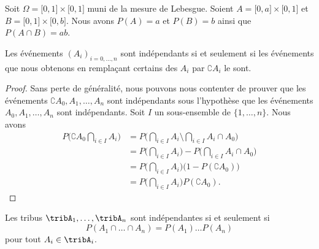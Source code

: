 \begin{example}
	Soit \( \Omega=\mathopen[ 0 , 1 \mathclose]\times \mathopen[ 0 , 1 \mathclose]\) muni de la mesure de Lebesgue. Soient \( A=\mathopen[ 0 , a \mathclose]\times \mathopen[ 0 , 1 \mathclose]\) et \( B=\mathopen[ 0 , 1 \mathclose]\times \mathopen[ 0 , b \mathclose]\). Nous avons \( P(A)=a\) et \( P(B)=b\) ainsi que \( P(A\cap B)=ab\).
\end{example}

\begin{lemma}       \label{LemIndepEvenCompl}
	Les événements \( (A_i)_{i=0,\ldots,n}\) sont indépendants si et seulement si les événements que nous obtenons en remplaçant certains des \( A_i\) par \( \complement A_i\) le sont.
\end{lemma}

\begin{proof}
	Sans perte de généralité, nous pouvons nous contenter de prouver que les événements \( \complement A_0,A_1,\ldots,A_n\) sont indépendants sous l'hypothèse que les événements \( A_0,A_1,\ldots,A_n\) sont indépendants. Soit \( I\) un sous-ensemble de \( \{ 1,\ldots,n \}\). Nous avons
	\begin{subequations}
		\begin{align}
			P\big( \complement A_0\bigcap_{i\in I}A_i \big) & =P\big( \bigcap_{i\in I}A_i\setminus\bigcap_{i\in I}A_i\cap A_0 \big)      \\
			                                                & =P\big( \bigcap_{i\in I}A_i \big)-P\big( \bigcap_{i\in I}A_i\cap A_0 \big) \\
			                                                & =P\big( \bigcap_{i\in I}A_i \big)\big( 1-P(\complement A_0) \big)          \\
			                                                & =P\big( \bigcap_{i\in I}A_i \big)P(\complement A_0).
		\end{align}
	\end{subequations}
\end{proof}

\begin{lemma}       \label{LemTribIndepProdProb}
	Les tribus \( \tribA_1,\ldots,\tribA_n\) sont indépendantes si et seulement si
	\begin{equation}
		P(A_1\cap\ldots\cap A_n)=P(A_1)\ldots P(A_n)
	\end{equation}
	pour tout \( A_i\in\tribA_i\).
\end{lemma}

